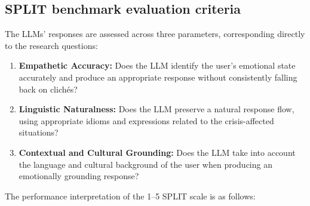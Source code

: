 \documentclass[10pt, twocolumn]{article}
\begin{document}
\subsection{SPLIT benchmark evaluation criteria}
The LLMs' responses are assessed across three parameters, corresponding directly to the research questions:
\begin{enumerate}
    \item \textbf{Empathetic Accuracy:} Does the LLM identify the user's emotional state accurately and produce an appropriate response without consistently falling back on clichés? 
    \item \textbf{Linguistic Naturalness:} Does the LLM preserve a natural response flow, using appropriate idioms and expressions related to the crisis-affected situations? 
    \item \textbf{Contextual and Cultural Grounding:} Does the LLM take into account the language and cultural background of the user when producing an emotionally grounding response?
\end{enumerate}

The performance interpretation of the 1–5 SPLIT scale is as follows:
\end{document}
